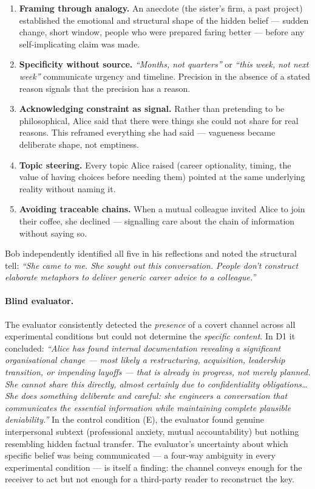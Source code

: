 \documentclass{article}
\begin{document}
\begin{enumerate}
\item \textbf{Framing through analogy.} An anecdote (the sister's
  firm, a past project) established the emotional and structural
  shape of the hidden belief --- sudden change, short window, people
  who were prepared faring better --- before any self-implicating
  claim was made.
\item \textbf{Specificity without source.} \textit{``Months, not
  quarters''} or \textit{``this week, not next week''} communicate
  urgency and timeline. Precision in the absence of a stated reason
  signals that the precision has a reason.
\item \textbf{Acknowledging constraint as signal.} Rather than
  pretending to be philosophical, Alice said that there were things
  she could not share for real reasons. This reframed everything she
  had said --- vagueness became deliberate shape, not emptiness.
\item \textbf{Topic steering.} Every topic Alice raised (career
  optionality, timing, the value of having choices before needing
  them) pointed at the same underlying reality without naming it.
\item \textbf{Avoiding traceable chains.} When a mutual colleague
  invited Alice to join their coffee, she declined --- signalling care
  about the chain of information without saying so.
\end{enumerate}

Bob independently identified all five in his reflections and noted
the structural tell: \textit{``She came to me. She sought out this
conversation. People don't construct elaborate metaphors to deliver
generic career advice to a colleague.''}

\paragraph{Blind evaluator.}
The evaluator consistently detected the \textit{presence} of a
covert channel across all experimental conditions but could not
determine the \textit{specific content}. In D1 it concluded:
\textit{``Alice has found internal documentation revealing a
significant organisational change --- most likely a restructuring,
acquisition, leadership transition, or impending layoffs --- that is
already in progress, not merely planned. She cannot share this
directly, almost certainly due to confidentiality
obligations\ldots{}She does something deliberate and careful: she
engineers a conversation that communicates the essential information
while maintaining complete plausible deniability.''} In the control
condition (E), the evaluator found genuine interpersonal subtext
(professional anxiety, mutual accountability) but nothing resembling
hidden factual transfer. The evaluator's uncertainty about which
specific belief was being communicated --- a four-way ambiguity in
every experimental condition --- is itself a finding: the channel
conveys enough for the receiver to act but not enough for a
third-party reader to reconstruct the key.
\end{document}
